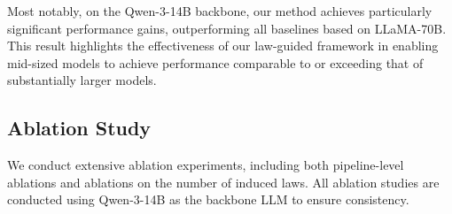 \documentclass{article}
\theoremstyle{plain}
\theoremstyle{definition}
\theoremstyle{remark}
\begin{document}
Most notably, on the Qwen-3-14B backbone, our method achieves particularly significant performance gains, outperforming all baselines based on LLaMA-70B. This result highlights the effectiveness of our law-guided framework in enabling mid-sized models to achieve performance comparable to or exceeding that of substantially larger models.

\subsection{Ablation Study}

We conduct extensive ablation experiments, including both pipeline-level ablations and ablations on the number of induced laws. All ablation studies are conducted using Qwen-3-14B as the backbone LLM to ensure consistency.
\end{document}
